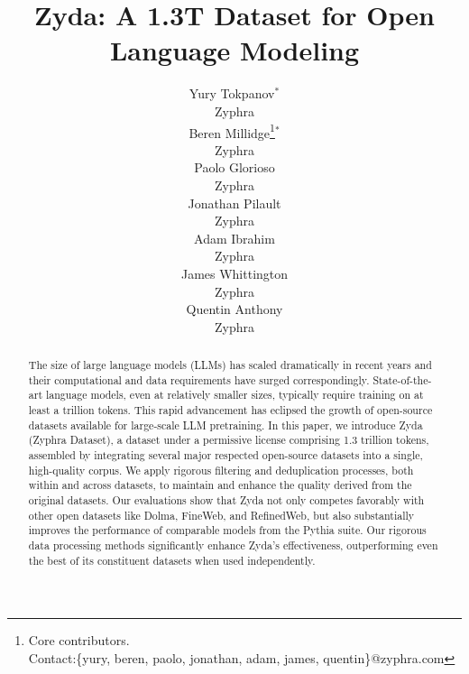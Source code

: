 \documentclass{article}
\title{Zyda: A 1.3T Dataset for Open Language Modeling}
\author{%
  Yury Tokpanov$^*$ \\
  Zyphra \\
  \And
  Beren Millidge\thanks{ Core contributors.\\ Contact:\{yury, beren, paolo, jonathan, adam, james, quentin\}@zyphra.com}$^*$ \\
  Zyphra \\
  \And
  Paolo Glorioso \\
  Zyphra \\
  \And
  Jonathan Pilault \\
  Zyphra \\
  \AND
  Adam Ibrahim \\
  Zyphra \\
  \And
  James Whittington \\
  Zyphra \\
  \And
  Quentin Anthony \\
  Zyphra \\
}
\begin{document}
\maketitle

\begin{abstract}

The size of large language models (LLMs) has scaled dramatically in recent years and their computational and data requirements have surged correspondingly. State-of-the-art language models, even at relatively smaller sizes, typically require training on at least a trillion tokens. This rapid advancement has eclipsed the growth of open-source datasets available for large-scale LLM pretraining. In this paper, we introduce Zyda (Zyphra Dataset), a dataset under a permissive license comprising 1.3 trillion tokens, assembled by integrating several major respected open-source datasets into a single, high-quality corpus. We apply rigorous filtering and deduplication processes, both within and across datasets, to maintain and enhance the quality derived from the original datasets. Our evaluations show that Zyda not only competes favorably with other open datasets like Dolma, FineWeb, and RefinedWeb, but also substantially improves the performance of comparable models from the Pythia suite. Our rigorous data processing methods significantly enhance Zyda's effectiveness, outperforming even the best of its constituent datasets when used independently.

\end{abstract}
\end{document}

